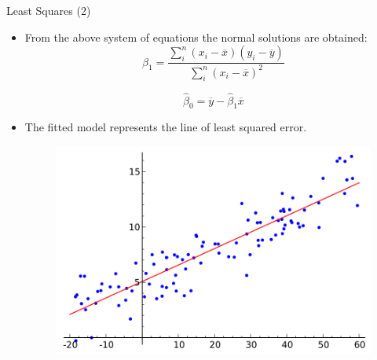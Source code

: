 \documentclass[handout]{beamer}
\begin{document}
\begin{frame}{Least Squares (2)}
\scriptsize{
\begin{itemize}
 \item From the above system of equations the normal solutions are obtained:
  \begin{equation}
 \hat{\beta}_{1} = \frac{\sum_{i}^{n} (x_i-\overline{x})(y_i-\overline{y}) }{ \sum_{i}^{n} (x_i-\overline{x})^2}    
 \end{equation}

 \begin{equation}
 \hat{\beta}_{0} = \overline{y} -\hat{\beta}_{1}\overline{x}    
 \end{equation}



\item The fitted model represents the line of least squared error.

\begin{figure}[h!]
	\centering
	\includegraphics[scale=0.35]{pics/Linear_regression.png}
\end{figure}

\end{itemize}

} 
 
\end{frame}
\end{document}
